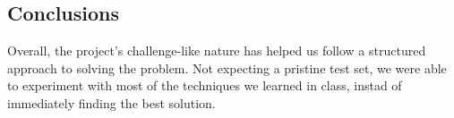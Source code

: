 \documentclass[11pt]{article}
\begin{document}
\begin{multicols}{2}
      \section{Conclusions}

      Overall, the project's challenge-like nature has helped us follow a
      structured approach to solving the problem. Not expecting a pristine test
      set, we were able to experiment with most of the techniques we learned in
      class, instad of immediately finding the best solution.

      
      

\end{multicols}
\end{document}
